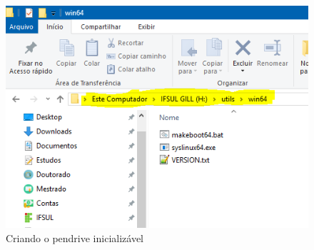 \documentclass{beamer}
\begin{document}
\begin{frame}
    \frametitle{\insertsection}
    \framesubtitle{\insertsubsection}
    
    \begin{figure}
        \centering
        \includegraphics[scale=0.62]{images/pendrivewin_extraido.png}
        \caption{Criando o pendrive inicializável}
    \end{figure}
  
\end{frame}
\end{document}
